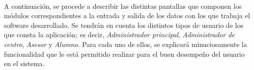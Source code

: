 \paragraph{}A continuación, se procede a describir las distintas pantallas que
componen los módulos correspondientes a la entrada y salida de los datos con los
que trabaja el software desarrollado. Se tendrán en cuenta los distintos tipos
de usuario de los que consta la aplicación; es decir, \textit{Administrador
principal}, \textit{Administrador de centro}, \textit{Asesor} y \textit{Alumno}.
Para cada uno de ellos, se explicará minuciosamente la funcionalidad que le está
permitido realizar para el buen desempeño del usuario en el sistema.